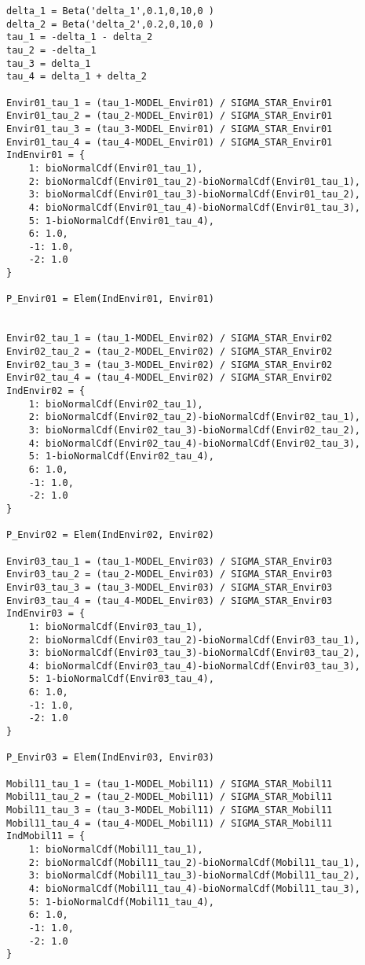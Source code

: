 \documentclass[12pt,a4paper]{article}
\begin{document}
\begin{lstlisting}[style=numbers]
delta_1 = Beta('delta_1',0.1,0,10,0 )
delta_2 = Beta('delta_2',0.2,0,10,0 )
tau_1 = -delta_1 - delta_2
tau_2 = -delta_1 
tau_3 = delta_1
tau_4 = delta_1 + delta_2

Envir01_tau_1 = (tau_1-MODEL_Envir01) / SIGMA_STAR_Envir01
Envir01_tau_2 = (tau_2-MODEL_Envir01) / SIGMA_STAR_Envir01
Envir01_tau_3 = (tau_3-MODEL_Envir01) / SIGMA_STAR_Envir01
Envir01_tau_4 = (tau_4-MODEL_Envir01) / SIGMA_STAR_Envir01
IndEnvir01 = {
    1: bioNormalCdf(Envir01_tau_1),
    2: bioNormalCdf(Envir01_tau_2)-bioNormalCdf(Envir01_tau_1),
    3: bioNormalCdf(Envir01_tau_3)-bioNormalCdf(Envir01_tau_2),
    4: bioNormalCdf(Envir01_tau_4)-bioNormalCdf(Envir01_tau_3),
    5: 1-bioNormalCdf(Envir01_tau_4),
    6: 1.0,
    -1: 1.0,
    -2: 1.0
}

P_Envir01 = Elem(IndEnvir01, Envir01)


Envir02_tau_1 = (tau_1-MODEL_Envir02) / SIGMA_STAR_Envir02
Envir02_tau_2 = (tau_2-MODEL_Envir02) / SIGMA_STAR_Envir02
Envir02_tau_3 = (tau_3-MODEL_Envir02) / SIGMA_STAR_Envir02
Envir02_tau_4 = (tau_4-MODEL_Envir02) / SIGMA_STAR_Envir02
IndEnvir02 = {
    1: bioNormalCdf(Envir02_tau_1),
    2: bioNormalCdf(Envir02_tau_2)-bioNormalCdf(Envir02_tau_1),
    3: bioNormalCdf(Envir02_tau_3)-bioNormalCdf(Envir02_tau_2),
    4: bioNormalCdf(Envir02_tau_4)-bioNormalCdf(Envir02_tau_3),
    5: 1-bioNormalCdf(Envir02_tau_4),
    6: 1.0,
    -1: 1.0,
    -2: 1.0
}

P_Envir02 = Elem(IndEnvir02, Envir02)

Envir03_tau_1 = (tau_1-MODEL_Envir03) / SIGMA_STAR_Envir03
Envir03_tau_2 = (tau_2-MODEL_Envir03) / SIGMA_STAR_Envir03
Envir03_tau_3 = (tau_3-MODEL_Envir03) / SIGMA_STAR_Envir03
Envir03_tau_4 = (tau_4-MODEL_Envir03) / SIGMA_STAR_Envir03
IndEnvir03 = {
    1: bioNormalCdf(Envir03_tau_1),
    2: bioNormalCdf(Envir03_tau_2)-bioNormalCdf(Envir03_tau_1),
    3: bioNormalCdf(Envir03_tau_3)-bioNormalCdf(Envir03_tau_2),
    4: bioNormalCdf(Envir03_tau_4)-bioNormalCdf(Envir03_tau_3),
    5: 1-bioNormalCdf(Envir03_tau_4),
    6: 1.0,
    -1: 1.0,
    -2: 1.0
}

P_Envir03 = Elem(IndEnvir03, Envir03)

Mobil11_tau_1 = (tau_1-MODEL_Mobil11) / SIGMA_STAR_Mobil11
Mobil11_tau_2 = (tau_2-MODEL_Mobil11) / SIGMA_STAR_Mobil11
Mobil11_tau_3 = (tau_3-MODEL_Mobil11) / SIGMA_STAR_Mobil11
Mobil11_tau_4 = (tau_4-MODEL_Mobil11) / SIGMA_STAR_Mobil11
IndMobil11 = {
    1: bioNormalCdf(Mobil11_tau_1),
    2: bioNormalCdf(Mobil11_tau_2)-bioNormalCdf(Mobil11_tau_1),
    3: bioNormalCdf(Mobil11_tau_3)-bioNormalCdf(Mobil11_tau_2),
    4: bioNormalCdf(Mobil11_tau_4)-bioNormalCdf(Mobil11_tau_3),
    5: 1-bioNormalCdf(Mobil11_tau_4),
    6: 1.0,
    -1: 1.0,
    -2: 1.0
}


\end{lstlisting}
\end{document}
